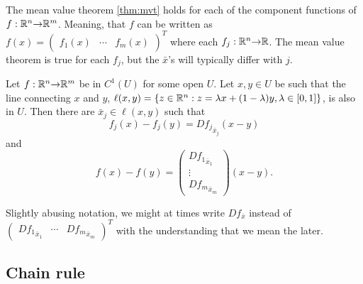 The mean value theorem \ref{thm:mvt} holds for each of the component
functions of $f:\mathbb{R}^n {\rightarrow} \mathbb{R}^m$. Meaning, that $f$ can be written as
$f(x) = \begin{pmatrix} f_1(x) & \cdots & f_m(x) \end{pmatrix}^T$
where each $f_j:\mathbb{R}^n {\rightarrow} \mathbb{R}$. The mean value theorem is true for each
$f_j$, but the $\bar{x}$'s will typically differ with $j$.
\begin{corollary}\label{thm:mvtm}
  Let $f:\mathbb{R}^n {\rightarrow} \mathbb{R}^m$ be in $C^1(U)$ for some open $U$. Let
  $x, y
  \in U$ be such that the line connecting $x$ and
  $y$, $\ell(x,y) =
  \{z\in \mathbb{R}^n: z = \lambda x + (1-\lambda) y, \lambda \in [0,1]\}$, is
  also in $U$. Then there are $\bar{x}_j \in \ell(x,y)$ such that
  \[ f_j(x) - f_j(y) = D{f_j}_{\bar{x}_j} (x-y) \]
  and
  \[ f(x) - f(y) = \begin{pmatrix} D{f_1}_{\bar{x}_1} \\
    \vdots \\
    D{f_m}_{\bar{x}_m} \end{pmatrix} (x-y). 
  \]  
\end{corollary}
Slightly abusing notation, we might at times write $Df_{\bar{x}}$
instead of $\begin{pmatrix} D{f_1}_{\bar{x}_1} & \cdots &
  D{f_m}_{\bar{x}_m} \end{pmatrix}^T$ with the understanding that we
mean the later.   

\subsection{Chain rule}

